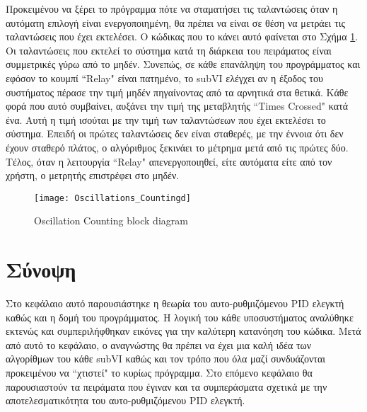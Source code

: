 Προκειμένου να ξέρει το πρόγραμμα πότε να σταματήσει τις ταλαντώσεις όταν η αυτόματη επιλογή είναι ενεργοποιημένη, θα πρέπει να είναι σε θέση να μετράει τις ταλαντώσεις που έχει εκτελέσει. Ο κώδικας που το κάνει αυτό φαίνεται στο Σχήμα \ref{fig:Oscillations_Countingd}. Οι ταλαντώσεις που εκτελεί το σύστημα κατά τη διάρκεια του πειράματος είναι συμμετρικές γύρω από το μηδέν. Συνεπώς, σε κάθε επανάληψη του προγράμματος και εφόσον το κουμπί ``Relay" είναι πατημένο, το subVI ελέγχει αν η έξοδος του συστήματος πέρασε την τιμή μηδέν πηγαίνοντας από τα αρνητικά στα θετικά. Κάθε φορά που αυτό συμβαίνει, αυξάνει την τιμή της μεταβλητής ``Times Crossed" κατά ένα. Αυτή η τιμή ισούται με την τιμή των ταλαντώσεων που έχει εκτελέσει το σύστημα. Επειδή οι πρώτες ταλαντώσεις δεν είναι σταθερές, με την έννοια ότι δεν έχουν σταθερό πλάτος, ο αλγόριθμος ξεκινάει το μέτρημα μετά από τις πρώτες δύο. Τέλος, όταν η λειτουργία ``Relay" απενεργοποιηθεί, είτε αυτόματα είτε από τον χρήστη, ο μετρητής επιστρέφει στο μηδέν.

\begin{figure}[h]
  \centering
  \texttt{[image: Oscillations\_Countingd]}
  \caption{Oscillation Counting block diagram}
  \label{fig:Oscillations_Countingd}
\end{figure}

\section{Σύνοψη}

Στο κεφάλαιο αυτό παρουσιάστηκε η θεωρία του αυτο-ρυθμιζόμενου PID ελεγκτή καθώς και η δομή του προγράμματος. Η λογική του κάθε υποσυστήματος αναλύθηκε εκτενώς και συμπεριλήφθηκαν εικόνες για την καλύτερη κατανόηση του κώδικα. Μετά από αυτό το κεφάλαιο, ο αναγνώστης θα πρέπει να έχει μια καλή ιδέα των αλγορίθμων του κάθε subVI καθώς και τον τρόπο που όλα μαζί συνδυάζονται προκειμένου να ``χτιστεί" το κυρίως πρόγραμμα. Στο επόμενο κεφάλαιο θα παρουσιαστούν τα πειράματα που έγιναν και τα συμπεράσματα σχετικά με την αποτελεσματικότητα του αυτο-ρυθμιζόμενου PID ελεγκτή.